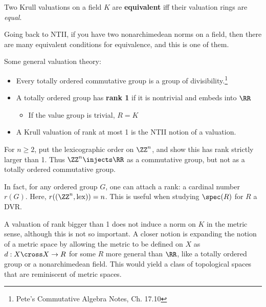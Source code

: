 \begin{definition}

Two Krull valuations on a field \(K\) are \textbf{equivalent} iff their
valuation rings are \emph{equal}.

\end{definition}

\begin{remark}

Going back to NTII, if you have two nonarchimedean norms on a field,
then there are many equivalent conditions for equivalence, and this is
one of them.

\end{remark}

Some general valuation theory:

\begin{itemize}
\item
  Every totally ordered commutative group is a group of
  divisibility.\footnote{Pete's Commutative Algebra Notes, Ch. 17.10}
\item
  A totally ordered group has \textbf{rank 1} if it is nontrivial and
  embeds into \(\RR\)

  \begin{itemize}
  \tightlist
  \item
    If the value group is trivial, \(R = K\)
  \end{itemize}
\item
  A Krull valuation of rank at most 1 is the NTII notion of a valuation.
\end{itemize}

\begin{exercise}[?]

For \(n\geq 2\), put the lexicographic order on \(\ZZ^n\), and show this
has rank strictly larger than 1. Thus \(\ZZ^n\injects \RR\) as a
commutative group, but not as a totally ordered commutative group.

\end{exercise}

\begin{remark}

In fact, for any ordered group \(G\), one can attach a rank: a cardinal
number \(r(G)\). Here, \(r((\ZZ^n, \text{lex})) = n\). This is useful
when studying \(\spec(R)\) for \(R\) a DVR.

\end{remark}

A valuation of rank bigger than 1 does not induce a norm on \(K\) in the
metric sense, although this is not so important. A closer notion is
expanding the notion of a metric space by allowing the metric to be
defined on \(X\) as \(d: X\cross X \to R\) for some \(R\) more general
than \(\RR\), like a totally ordered group or a nonarchimedean field.
This would yield a class of topological spaces that are reminiscent of
metric spaces.


